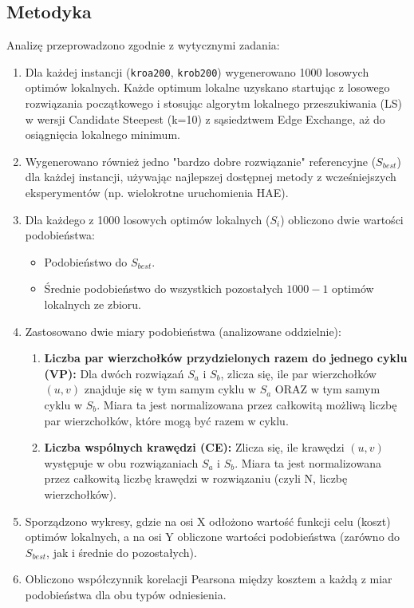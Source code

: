 \documentclass[12pt,a4paper]{article}
\begin{document}
\subsection{Metodyka}
Analizę przeprowadzono zgodnie z wytycznymi zadania:
\begin{enumerate}
    \item Dla każdej instancji (\texttt{kroa200}, \texttt{krob200}) wygenerowano 1000 losowych optimów lokalnych. Każde optimum lokalne uzyskano startując z losowego rozwiązania początkowego i stosując algorytm lokalnego przeszukiwania (LS) w wersji Candidate Steepest (k=10) z sąsiedztwem Edge Exchange, aż do osiągnięcia lokalnego minimum.
    \item Wygenerowano również jedno "bardzo dobre rozwiązanie" referencyjne ($S_{best}$) dla każdej instancji, używając najlepszej dostępnej metody z wcześniejszych eksperymentów (np. wielokrotne uruchomienia HAE).
    \item Dla każdego z 1000 losowych optimów lokalnych ($S_i$) obliczono dwie wartości podobieństwa:
    \begin{itemize}
        \item Podobieństwo do $S_{best}$.
        \item Średnie podobieństwo do wszystkich pozostałych $1000-1$ optimów lokalnych ze zbioru.
    \end{itemize}
    \item Zastosowano dwie miary podobieństwa (analizowane oddzielnie):
    \begin{enumerate}
        \item \textbf{Liczba par wierzchołków przydzielonych razem do jednego cyklu (VP):} Dla dwóch rozwiązań $S_a$ i $S_b$, zlicza się, ile par wierzchołków $(u,v)$ znajduje się w tym samym cyklu w $S_a$ ORAZ w tym samym cyklu w $S_b$. Miara ta jest normalizowana przez całkowitą możliwą liczbę par wierzchołków, które mogą być razem w cyklu.
        \item \textbf{Liczba wspólnych krawędzi (CE):} Zlicza się, ile krawędzi $(u,v)$ występuje w obu rozwiązaniach $S_a$ i $S_b$. Miara ta jest normalizowana przez całkowitą liczbę krawędzi w rozwiązaniu (czyli N, liczbę wierzchołków).
    \end{enumerate}
    \item Sporządzono wykresy, gdzie na osi X odłożono wartość funkcji celu (koszt) optimów lokalnych, a na osi Y obliczone wartości podobieństwa (zarówno do $S_{best}$, jak i średnie do pozostałych).
    \item Obliczono współczynnik korelacji Pearsona między kosztem a każdą z miar podobieństwa dla obu typów odniesienia.
\end{enumerate}
\end{document}

